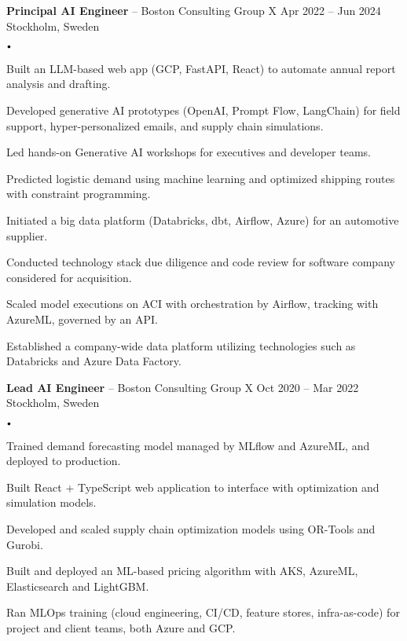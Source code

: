 \documentclass{article}
\newcommand{\experience}[5]{
    \vspace*{2pt}
    \textbf{#1} -- #2 \hfill #3 \\ 
    #4 \\
    #5
    \vspace*{2pt}
}
\newcommand{\spacedbullet}{
    $\vcenter{\hbox{\tiny$\bullet$}}$\hspace*{-2pt}
}
\newenvironment{bulletlist}{
    \begin{list}
        {\spacedbullet}{\setlength\leftmargin{10pt} 
        \topsep 0pt \itemsep -2pt}}{\vspace*{4pt}
    \end{list}
}
\begin{document}
\experience{Principal AI Engineer}{Boston Consulting Group X}{Apr 2022 -- Jun 2024}{Stockholm, Sweden}
{
    \begin{bulletlist}
        \item Built an LLM-based web app (GCP, FastAPI, React) to automate annual report analysis and drafting.
        \item Developed generative AI prototypes (OpenAI, Prompt Flow, LangChain) for field support, hyper-personalized emails, and supply chain simulations.
        \item Led hands-on Generative AI workshops for executives and developer teams.
        \item Predicted logistic demand using machine learning and optimized shipping routes with constraint programming.
        \item Initiated a big data platform (Databricks, dbt, Airflow, Azure) for an automotive supplier.
        \item Conducted technology stack due diligence and code review for software company considered for acquisition.
        \item Scaled model executions on ACI with orchestration by Airflow, tracking with AzureML, governed by an API.
        \item Established a company-wide data platform utilizing technologies such as Databricks and Azure Data Factory.
    \end{bulletlist}
}

\experience{Lead AI Engineer}{Boston Consulting Group X}{Oct 2020 -- Mar 2022}{Stockholm, Sweden}
{
    \begin{bulletlist}
        \item Trained demand forecasting model managed by MLflow and AzureML, and deployed to production.
        \item Built React + TypeScript web application to interface with optimization and simulation models.
        \item Developed and scaled supply chain optimization models using OR-Tools and Gurobi.
        \item Built and deployed an ML-based pricing algorithm with AKS, AzureML, Elasticsearch and LightGBM.
        \item Ran MLOps training (cloud engineering, CI/CD, feature stores, infra-as-code) for project and client teams, both Azure and GCP.
    \end{bulletlist}
}
\end{document}
